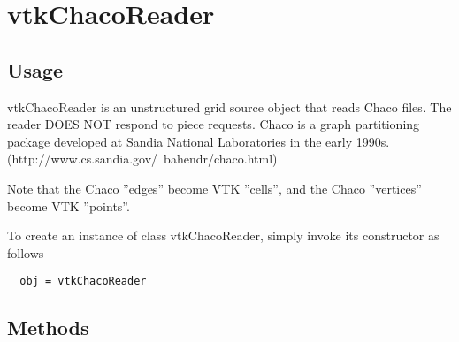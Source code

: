\section{vtkChacoReader}

\subsection{Usage}

 vtkChacoReader is an unstructured grid source object that reads Chaco
 files.  The reader DOES NOT respond to piece requests. Chaco
 is a graph partitioning package developed at Sandia National Laboratories
 in the early 1990s.  (http://www.cs.sandia.gov/~bahendr/chaco.html)

 Note that the Chaco ''edges'' become VTK ''cells'', and the Chaco
 ''vertices'' become VTK ''points''.

To create an instance of class vtkChacoReader, simply
invoke its constructor as follows
\begin{verbatim}
  obj = vtkChacoReader
\end{verbatim}
\subsection{Methods}

